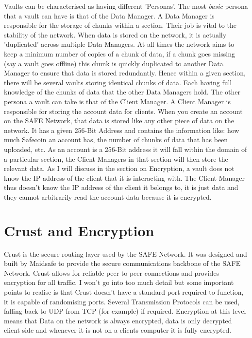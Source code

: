 \documentclass{l4proj}
\begin{document}
Vaults can be characterised as having different 'Personas'. The most \textit{basic} persona that a vault can have is that of the Data Manager. A Data Manager is responsible for the storage of chunks within a section. Their job is vital to the stability of the network. When data is stored on the network, it is actually 'duplicated' across multiple Data Managers. At all times the network aims to keep a minimum number of copies of a chunk of data, if a chunk goes missing (say a vault goes offline) this chunk is quickly duplicated to another Data Manager to ensure that data is stored redundantly. Hence within a given section, there will be several vaults storing identical chunks of data. Each having full knowledge of the chunks of data that the other Data Managers hold. The other persona a vault can take is that of the Client Manager. A Client Manager is responsible for storing the account data for clients. When you create an account on the SAFE Network, that data is stored like any other piece of data on the network. It has a given 256-Bit Address and contains the information like: how much Safecoin an account has, the number of chunks of data that has been uploaded, etc. As an account is a 256-Bit address it will fall within the domain of a particular section, the Client Managers in that section will then store the relevant data. As I will discuss in the section on Encryption, a vault does not know the IP address of the client that it is interacting with. The Client Manager thus doesn't know the IP address of the client it belongs to, it is just data and they cannot arbitrarily read the account data because it is encrypted.

\section{Crust and Encryption}

Crust is the secure routing layer used by the SAFE Network. It was designed and built by Maidsafe to provide the secure communications backbone of the SAFE Network. Crust allows for reliable peer to peer connections and provides encryption for all traffic. I won't go into too much detail but some important points to realise is that Crust doesn't have a standard port required to function, it is capable of randomising ports. Several Transmission Protocols can be used, falling back to UDP from TCP (for example) if required. Encryption at this level means that Data on the network is always encrypted, data is only decrypted client side and whenever it is not on a clients computer it is fully encrypted.
\end{document}
